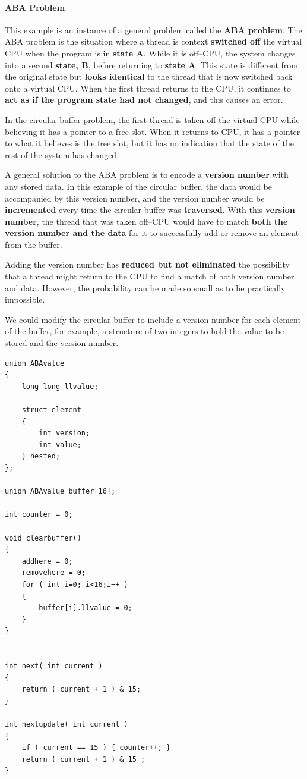 \documentclass[12pt,a4paper]{report}
\begin{document}
\paragraph*{ABA Problem}
This example is an instance of a general problem called the \textbf{ABA problem}. The ABA problem is the situation where a thread is context \textbf{switched off} the virtual CPU when the program is in \textbf{state A}. While it is off--CPU, the system changes into a second\textbf{ state, B}, before returning to \textbf{state A}. This state is different from the original state but \textbf{looks identical} to the thread that is now switched back onto a virtual CPU. When the first thread returns to the CPU, it continues to \textbf{act as if the program state had not changed}, and this causes an error.
\par
In the circular buffer problem, the first thread is taken off the virtual CPU while believing it has a pointer to a free slot. When it returns to CPU, it has a pointer to what it believes is the free slot, but it has no indication that the state of the rest of the system has changed.
\par
A general solution to the ABA problem is to encode a \textbf{version number} with any stored data. In this example of the circular buffer, the data would be accompanied by this version number, and the version number would be \textbf{incremented} every time the circular buffer was \textbf{traversed}. With this \textbf{version number}, the thread that was taken off--CPU would have to match \textbf{both the version number and the data} for it to successfully add or remove an element from the buffer.
\par
Adding the version number has \textbf{reduced but not eliminated} the possibility that a thread might return to the CPU to find a match of both version number and data. However, the probability can be made so small as to be practically impossible.
\par
We could modify the circular buffer to include a version number for each element of the buffer, for example, a structure of two integers to hold the value to be stored and the version number. 
\begin{lstlisting}
union ABAvalue
{
	long long llvalue;
	
	struct element
	{
		int version;
		int value;
	} nested;
};

union ABAvalue buffer[16];

int counter = 0;

void clearbuffer()
{
	addhere = 0;
	removehere = 0;
	for ( int i=0; i<16;i++ )
	{
		buffer[i].llvalue = 0;
	}
}


int next( int current )
{
	return ( current + 1 ) & 15;
}

int nextupdate( int current )
{
	if ( current == 15 ) { counter++; }
	return ( current + 1 ) & 15 ;
}
\end{lstlisting}
\end{document}
